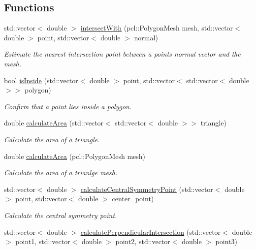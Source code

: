 \subsection*{Functions}
\begin{DoxyCompactItemize}
\item 
std\+::vector$<$ double $>$ \hyperlink{namespacebenchmark_a2d148ddad0fb0499866dd454cde1767a}{intersect\+With} (pcl\+::\+Polygon\+Mesh mesh, std\+::vector$<$ double $>$ point, std\+::vector$<$ double $>$ normal)
\begin{DoxyCompactList}\small\item\em Estimate the nearest intersection point between a point\textquotesingle{}s normal vector and the mesh. \end{DoxyCompactList}\item 
bool \hyperlink{namespacebenchmark_a1e580512121573111919f5d97ca986d3}{is\+Inside} (std\+::vector$<$ double $>$ point, std\+::vector$<$ std\+::vector$<$ double $>$$>$ polygon)
\begin{DoxyCompactList}\small\item\em Confirm that a point lies inside a polygon. \end{DoxyCompactList}\item 
double \hyperlink{namespacebenchmark_a11e8b8b42926972c4a1795c588d8efa7}{calculate\+Area} (std\+::vector$<$ std\+::vector$<$ double $>$$>$ triangle)
\begin{DoxyCompactList}\small\item\em Calculate the area of a triangle. \end{DoxyCompactList}\item 
double \hyperlink{namespacebenchmark_a82d4720417fd81d07521ce48ccaebeac}{calculate\+Area} (pcl\+::\+Polygon\+Mesh mesh)
\begin{DoxyCompactList}\small\item\em Calculate the area of a trianlge mesh. \end{DoxyCompactList}\item 
std\+::vector$<$ double $>$ \hyperlink{namespacebenchmark_a7885a2fc3dcb43d1198a2fd4111135dc}{calculate\+Central\+Symmetry\+Point} (std\+::vector$<$ double $>$ point, std\+::vector$<$ double $>$ center\+\_\+point)
\begin{DoxyCompactList}\small\item\em Calculate the central symmetry point. \end{DoxyCompactList}\item 
std\+::vector$<$ double $>$ \hyperlink{namespacebenchmark_a208595619c985eb145eb12cfcb981e8a}{calculate\+Perpendicular\+Intersection} (std\+::vector$<$ double $>$ point1, std\+::vector$<$ double $>$ point2, std\+::vector$<$ double $>$ point3)

\end{DoxyCompactItemize}

